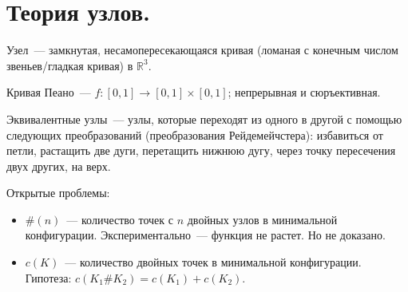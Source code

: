 \documentclass[12pt]{article}
\begin{document}
	
	
	\section{Теория узлов.}
	\begin{definition}
		Узел~--- замкнутая, несамопересекающаяся кривая (ломаная с конечным числом звеньев/гладкая кривая) в $\mathbb{R}^3$.
	\end{definition}
	\begin{definition}
		Кривая Пеано~--- $f: [0, 1] \rightarrow [0, 1] \times [0, 1]$; непрерывная и сюръективная.
	\end{definition}
	\begin{definition}
		Эквивалентные узлы~--- узлы, которые переходят из одного в другой с помощью следующих преобразований (преобразования Рейдемейчстера): избавиться от петли, растащить две дуги, перетащить нижнюю дугу, через точку пересечения двух других, на верх.
	\end{definition}
	\begin{note}
		Открытые проблемы:
		\begin{itemize}
			\item $\# (n)$~--- количество точек с $n$ двойных узлов в минимальной конфигурации. Экспериментально~--- функция не растет. Но не доказано.
			\item $c(K)$~--- количество двойных точек в минимальной конфигурации. Гипотеза: $c(K_1 \# K_2) = c(K_1) + c(K_2)$.
		\end{itemize}
	\end{note}
\end{document}
